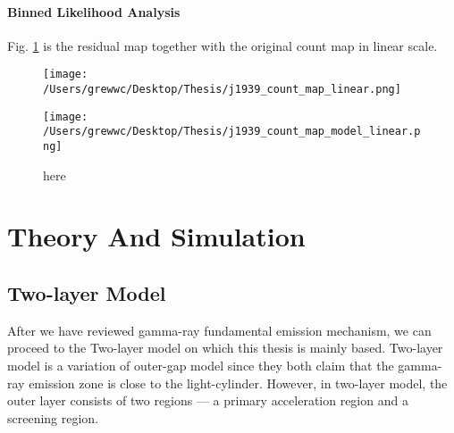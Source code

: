 \documentclass[12pt]{report}
\newcommand{\mycaption}[1]{\protect \caption{#1}}
\begin{document}
        \subsubsection{Binned Likelihood Analysis}
          Fig. \ref{fig: j1939_count_map_diff} is the residual map together with the 
          original count map in linear scale.
          \begin{figure}[!ht]
            \begin{center}
            \begin{minipage}{0.45\textwidth}
              \begin{center} 
                \texttt{[image: /Users/grewwc/Desktop/Thesis/j1939\_count\_map\_linear.png]}
              \end{center}
            \end{minipage}
            \begin{minipage}{0.45\textwidth}
              \begin{center}
                \texttt{[image: /Users/grewwc/Desktop/Thesis/j1939\_count\_map\_model\_linear.png]}
              \end{center}
            \end{minipage}
          \end{center}
          \caption{here}
          
          \label{fig: j1939_count_map_diff}
        \end{figure}
        \vspace{1cm}

    \chapter{Theory And Simulation}
      \section{Two-layer Model}
        After we have reviewed gamma-ray fundamental emission mechanism, we can proceed to
        the Two-layer model on which this thesis is mainly based. Two-layer model is a 
        variation of outer-gap model since they both claim that the gamma-ray emission zone
        is close to the light-cylinder. However, in two-layer model, the outer layer 
        consists of two regions --- a primary acceleration region and a screening region. 
\end{document}
